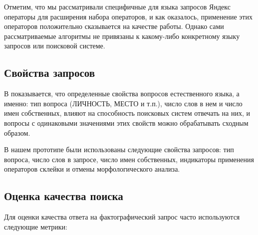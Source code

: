 \documentclass{article}
\begin{document}
Отметим, что мы рассматривали специфичные для языка запросов Яндекс
операторы для расширения набора операторов, и как оказалось, 
применение этих операторов положительно сказывается на качестве работы. 
Однако сами рассматриваемые алгоритмы не привязаны к какому-либо
конкретному языку запросов или поисковой системе.

\subsection{Свойства запросов}
В \cite{qa:radev:getting_answers} показывается, что определенные
свойства вопросов естественного языка, а именно: тип вопроса (ЛИЧНОСТЬ, МЕСТО и т.п.),
число слов в нем и число имен собственных,
влияют на способность поисковых систем отвечать на них, и вопросы с одинаковыми значениями
этих свойств можно обрабатывать сходным образом.

В нашем прототипе были использованы следующие свойства запросов:
тип вопроса,
число слов в запросе,
число имен собственных,
индикаторы применения операторов склейки и отмены морфологического анализа.



\subsection{Оценка качества поиска} \label{trdr}

Для оценки качества ответа на фактографический запрос часто
используются следующие метрики:
\end{document}
